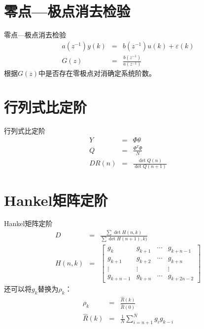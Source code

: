\section{零点—极点消去检验}
\begin{frame}{零点—极点消去检验}
\begin{eqnarray*}
a(z^{-1})y(k) &=& b(z^{-1})u(k)+\varepsilon(k) \\
G(z) &=& \frac{b(z^{-1})}{a(z^{-1})}
\end{eqnarray*}
根据$G(z)$中是否存在零极点对消确定系统阶数。
\end{frame}

\section{行列式比定阶}
\begin{frame}{行列式比定阶}
\begin{eqnarray*}
Y &=& \Phi\theta \\
Q &=& \frac{\Phi^T\Phi}{N} \\
DR(n) &=& \frac{\det Q(n)}{\det Q(n+1)}
\end{eqnarray*}
\end{frame}

\section{Hankel矩阵定阶}
\begin{frame}{Hankel矩阵定阶}
\begin{eqnarray*}
D &=& \frac{\sum \det H(n,k)}{\sum \det H(n+1),k)} \\
H(n,k) &=& \begin{bmatrix}
g_k & g_{k+1} & \cdots & g_{k+n-1} \\
g_{k+1} & g_{k+2} & \cdots & g_{k+n} \\
\vdots &  \vdots  &       & \vdots \\
g_{k+n-1} & g_{k+n} & \cdots & g_{k+2n-2} 
\end{bmatrix}
\end{eqnarray*}
还可以将$g_k$替换为$\rho_k$：
\begin{eqnarray*}
\rho_k &=& \frac{\hat R(k)}{\hat R(0)} \\
\hat R(k) &=& \frac{1}{N}\sum_{i=n+1}^N g_i g_{k-i}
\end{eqnarray*}
\end{frame}




